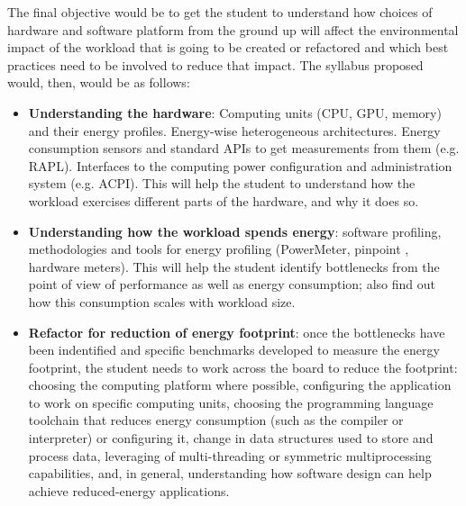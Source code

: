 \documentclass[sigconf]{acmart}
\begin{document}
The final objective would be to get the student to understand how choices of
hardware and software platform from the ground up will affect the environmental
impact of the workload that is going to be created or refactored and which best
practices need to be involved to reduce that impact. The syllabus proposed
would, then, would be as follows:\begin{itemize}
\item {\bf Understanding the hardware}: Computing units (CPU, GPU, memory) and their energy profiles. Energy-wise
  heterogeneous architectures. Energy consumption sensors and
  standard APIs to get measurements from them (e.g. RAPL). Interfaces to the
  computing power configuration and administration system (e.g. ACPI). This will
  help the student to understand how the workload exercises different parts of
  the hardware, and why it does so.
\item {\bf Understanding how the workload spends energy}: software profiling,
  methodologies and tools for energy profiling (PowerMeter, pinpoint
  \cite{9307947}, hardware meters). This will help the student identify
  bottlenecks from the point of view of performance as well as energy
  consumption; also find out how this consumption scales with workload size.
\item {\bf Refactor for reduction of energy footprint}: once the bottlenecks
  have been indentified and specific benchmarks developed to measure the energy
  footprint, the student needs to work across the board to reduce the footprint:
  choosing the computing platform where possible, configuring the application to
  work on specific computing units, choosing the programming language toolchain
  that reduces energy consumption (such as the compiler or interpreter) or
  configuring it, change
  in data structures used to store and process data, leveraging of
  multi-threading or symmetric multiprocessing capabilities, and, in general,
  understanding how software design can help achieve reduced-energy
  applications.
\end{itemize}
  



\end{document}
